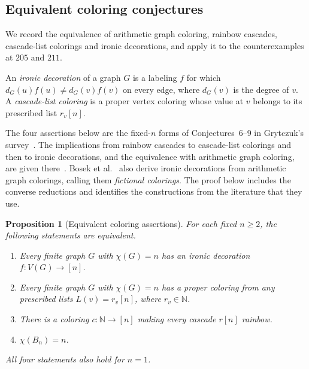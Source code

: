 \documentclass[11pt,reqno]{amsart}
\newcommand{\N}{\mathbb N}
\newtheorem{proposition}[theorem]{Proposition}
\theoremstyle{definition}
\theoremstyle{remark}
\numberwithin{equation}{section}
\begin{document}
\FloatBarrier
\begin{samepage}
\section{Equivalent coloring conjectures}\label{sec:decorations}

We record the equivalence of arithmetic graph coloring, rainbow
cascades, cascade-list colorings and ironic decorations, and apply it
to the counterexamples at $205$ and $211$.

An \emph{ironic decoration} of a graph $G$ is a labeling $f$ for which
$d_G(u)f(u)\ne d_G(v)f(v)$ on every edge, where $d_G(v)$ is the degree
of $v$. A \emph{cascade-list coloring} is a proper vertex coloring whose
value at $v$ belongs to its prescribed list $r_v[n]$.

The four assertions below are the fixed-$n$ forms of Conjectures~6--9
in Grytczuk's survey~\cite{Gryt}. The implications from rainbow
cascades to cascade-list colorings and then to ironic decorations,
and the equivalence with arithmetic graph coloring, are given
there~\cite[\S2.6, \S3.1 and \S3.3]{Gryt}.
Bosek et al.~\cite[Theorem~6]{Bosek} also derive ironic decorations
from arithmetic graph colorings, calling them \emph{fictional colorings}.
The proof below includes the converse reductions and identifies the
constructions from the literature that they use.

\begin{proposition}[Equivalent coloring assertions]\label{prop:cascade-equivalence}
For each fixed $n\ge2$, the following statements are equivalent.
\begin{enumerate}
\renewcommand{\theenumi}{\roman{enumi}}
\renewcommand{\labelenumi}{\textup{(\theenumi)}}
\item Every finite graph $G$ with $\chi(G)=n$ has an ironic decoration
$f:V(G)\to[n]$.
\item Every finite graph $G$ with $\chi(G)=n$ has a proper coloring
from any prescribed lists $L(v)=r_v[n]$, where $r_v\in\N$.
\item There is a coloring $c:\N\to[n]$ making every cascade $r[n]$ rainbow.
\item $\chi(B_n)=n$.
\end{enumerate}
All four statements also hold for $n=1$.
\end{proposition}
\end{samepage}
\end{document}
